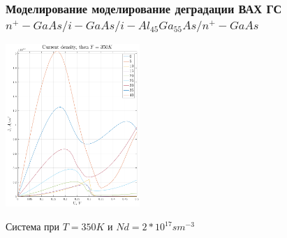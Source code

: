 \documentclass[10pt,pdf,hyperref={unicode},aspectratio={169}]{beamer}
\begin{document}
\begin{frame}
	\frametitle{Моделирование моделирование деградации ВАХ ГС $n^{+}\!-\!GaAs/i\!-\!GaAs/i\!-\!Al_{45}Ga_{55}As/ n^{+}\!-\!GaAs$}
		\begin{center}
			\includegraphics[width=0.38\textwidth]{assets/J1DAlGaAs_Si}

			Система при $T = 350K$ и $Nd = 2*10^{17} sm^{-3}$
		\end{center}
\end{frame}
\end{document}
